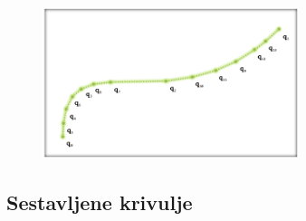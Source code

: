 \documentclass{article}
\begin{document}
\begin{itemize}
        \begin{figure}[H]
        \centering
        \includegraphics[width=75mm]{src/risanje_bezierjevih_krivulj.png}
        \end{figure}      
\end{itemize}

\subsection{Sestavljene krivulje}
\end{document}
